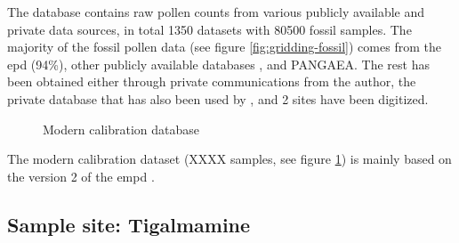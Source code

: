 \begin{refsection}
The database contains raw pollen counts from various publicly available and private data sources, in total 1350 datasets with 80500 fossil samples. The majority of the fossil pollen data (see figure \ref{fig:gridding-fossil}) comes from the \gls{epd} (94\%), other publicly available databases , and PANGAEA. The  rest has been obtained either through private communications from the author, the private database that has also been used by \cite{MauriDavisCollinsEtAl2015}, and 2 sites have been digitized.

\begin{figure}
	\caption{Modern calibration database}
	\label{fig:gridding-modern}
\end{figure}

The modern calibration dataset (XXXX samples, see figure \ref{fig:gridding-modern}) is mainly based on the version 2 of the \gls{empd} \citep{DavisZanonCollinsEtAl2013}. 


\subsection{Sample site: Tigalmamine} \label{sec:gridding-sample-site}


\end{refsection}
